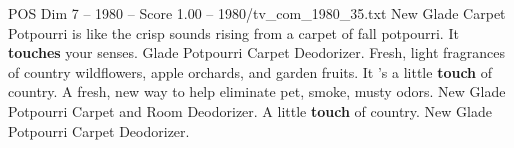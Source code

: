 \begin{textsample}{POS Dim 7 – 1980 – Score 1.00 – 1980/tv\_com\_1980\_35.txt}  \label{ex:f7_pos_044}
New Glade Carpet Potpourri is like the crisp sounds rising from a carpet of fall potpourri.
It \textbf{touches} your senses.
Glade Potpourri Carpet Deodorizer.
Fresh, light fragrances of country wildflowers, apple orchards, and garden fruits.
It 's a little \textbf{touch} of country.
A fresh, new way to help eliminate pet, smoke, musty odors.
New Glade Potpourri Carpet and Room Deodorizer.
A little \textbf{touch} of country.
New Glade Potpourri Carpet Deodorizer.

\end{textsample}
